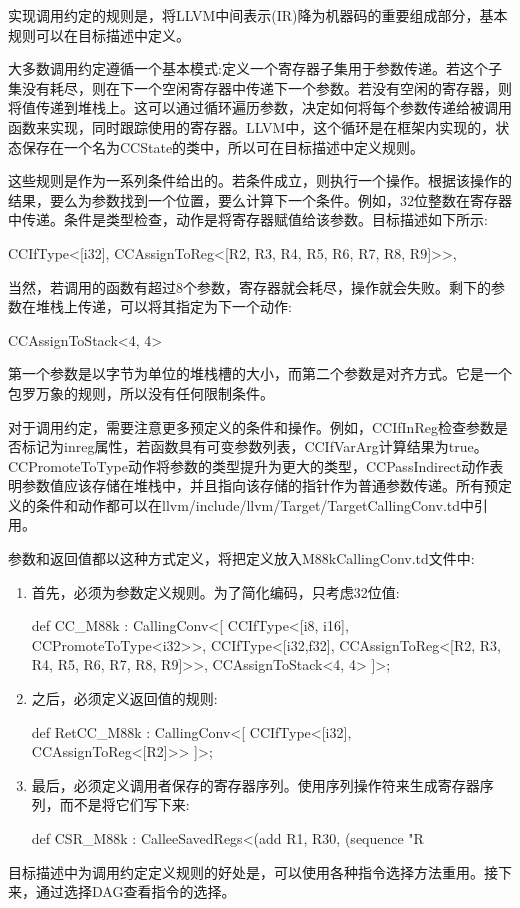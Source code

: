
实现调用约定的规则是，将LLVM中间表示(IR)降为机器码的重要组成部分，基本规则可以在目标描述中定义。

大多数调用约定遵循一个基本模式:定义一个寄存器子集用于参数传递。若这个子集没有耗尽，则在下一个空闲寄存器中传递下一个参数。若没有空闲的寄存器，则将值传递到堆栈上。这可以通过循环遍历参数，决定如何将每个参数传递给被调用函数来实现，同时跟踪使用的寄存器。LLVM中，这个循环是在框架内实现的，状态保存在一个名为CCState的类中，所以可在目标描述中定义规则。

这些规则是作为一系列条件给出的。若条件成立，则执行一个操作。根据该操作的结果，要么为参数找到一个位置，要么计算下一个条件。例如，32位整数在寄存器中传递。条件是类型检查，动作是将寄存器赋值给该参数。目标描述如下所示:

\begin{shell}
CCIfType<[i32],
        CCAssignToReg<[R2, R3, R4, R5, R6, R7, R8, R9]>>,
\end{shell}

当然，若调用的函数有超过8个参数，寄存器就会耗尽，操作就会失败。剩下的参数在堆栈上传递，可以将其指定为下一个动作:

\begin{shell}
CCAssignToStack<4, 4>
\end{shell}

第一个参数是以字节为单位的堆栈槽的大小，而第二个参数是对齐方式。它是一个包罗万象的规则，所以没有任何限制条件。


对于调用约定，需要注意更多预定义的条件和操作。例如，CCIfInReg检查参数是否标记为inreg属性，若函数具有可变参数列表，CCIfVarArg计算结果为true。CCPromoteToType动作将参数的类型提升为更大的类型，CCPassIndirect动作表明参数值应该存储在堆栈中，并且指向该存储的指针作为普通参数传递。所有预定义的条件和动作都可以在llvm/include/llvm/Target/TargetCallingConv.td中引用。

参数和返回值都以这种方式定义，将把定义放入M88kCallingConv.td文件中:

\begin{enumerate}
\item
首先，必须为参数定义规则。为了简化编码，只考虑32位值:

\begin{cpp}
def CC_M88k : CallingConv<[
    CCIfType<[i8, i16], CCPromoteToType<i32>>,
    CCIfType<[i32,f32],
        CCAssignToReg<[R2, R3, R4, R5, R6, R7, R8, R9]>>,
    CCAssignToStack<4, 4>
]>;
\end{cpp}

\item
之后，必须定义返回值的规则:

\begin{cpp}
def RetCC_M88k : CallingConv<[
    CCIfType<[i32], CCAssignToReg<[R2]>>
]>;
\end{cpp}

\item
最后，必须定义调用者保存的寄存器序列。使用序列操作符来生成寄存器序列，而不是将它们写下来:

\begin{cpp}
def CSR_M88k :
    CalleeSavedRegs<(add R1, R30,
        (sequence "R%
\end{cpp}
\end{enumerate}

目标描述中为调用约定定义规则的好处是，可以使用各种指令选择方法重用。接下来，通过选择DAG查看指令的选择。




